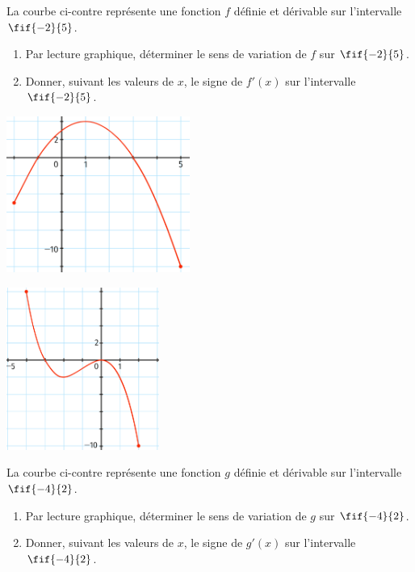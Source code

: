 \documentclass[a4paper,11pt,exos]{nsi} %
\begin{document}
\begin{minipage}{10cm}
	\exo{}
	La courbe ci-contre représente une fonction $f$ définie et dérivable sur l'intervalle $\fif{-2}{5}$.
	\begin{enumerate}
		\item 	Par lecture graphique, déterminer le sens de variation de $f$ sur $\fif{-2}{5}$.
		\item 	Donner, suivant les valeurs de $x$, le signe de $f'(x)$ sur l'intervalle $\fif{-2}{5}$.
	\end{enumerate}
\end{minipage}
\begin{minipage}{7cm}
	\begin{flushright}
		\includegraphics[width=6cm]{courbe1}
	\end{flushright}
\end{minipage}


\begin{minipage}{6cm}
	\includegraphics[width=5cm]{courbe2}
\end{minipage}
\begin{minipage}{11cm}
	\exo{}
	La courbe ci-contre représente une fonction $g$ définie et dérivable sur l'intervalle $\fif{-4}{2}$.
	\begin{enumerate}
		\item 	Par lecture graphique, déterminer le sens de variation de $g$ sur $\fif{-4}{2}$.
		\item 	Donner, suivant les valeurs de $x$, le signe de $g'(x)$ sur l'intervalle $\fif{-4}{2}$.
	\end{enumerate}
\end{minipage}
\end{document}
